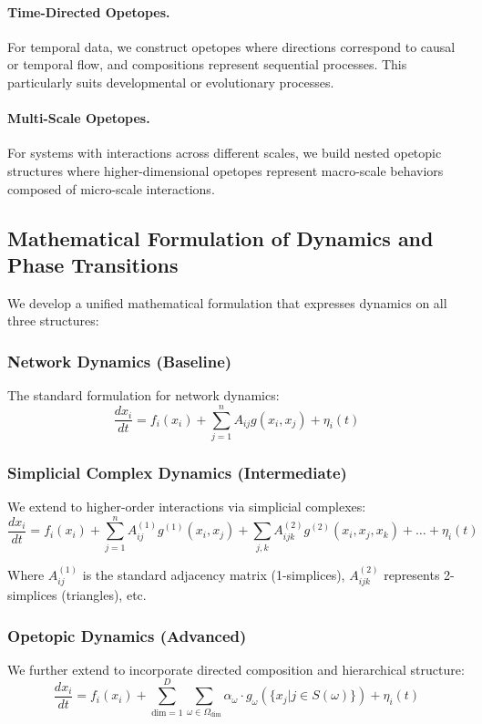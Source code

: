\paragraph{Time-Directed Opetopes.} For temporal data, we construct opetopes where directions correspond to causal or temporal flow, and compositions represent sequential processes. This particularly suits developmental or evolutionary processes.

\paragraph{Multi-Scale Opetopes.} For systems with interactions across different scales, we build nested opetopic structures where higher-dimensional opetopes represent macro-scale behaviors composed of micro-scale interactions.

\subsection{Mathematical Formulation of Dynamics and Phase Transitions}
We develop a unified mathematical formulation that expresses dynamics on all three structures:

\subsubsection{Network Dynamics (Baseline)}
The standard formulation for network dynamics:
\begin{equation}
\frac{dx_i}{dt} = f_i(x_i) + \sum_{j=1}^{n} A_{ij}g(x_i, x_j) + \eta_i(t)
\end{equation}

\subsubsection{Simplicial Complex Dynamics (Intermediate)}
We extend to higher-order interactions via simplicial complexes:
\begin{equation}
\frac{dx_i}{dt} = f_i(x_i) + \sum_{j=1}^{n} A_{ij}^{(1)}g^{(1)}(x_i, x_j) + \sum_{j,k} A_{ijk}^{(2)}g^{(2)}(x_i, x_j, x_k) + \ldots + \eta_i(t)
\end{equation}

Where $A_{ij}^{(1)}$ is the standard adjacency matrix (1-simplices), $A_{ijk}^{(2)}$ represents 2-simplices (triangles), etc.

\subsubsection{Opetopic Dynamics (Advanced)}
We further extend to incorporate directed composition and hierarchical structure:
\begin{equation}
\frac{dx_i}{dt} = f_i(x_i) + \sum_{\text{dim}=1}^{D}\sum_{\omega \in \Omega_{\text{dim}}} \alpha_\omega \cdot g_\omega(\{x_j | j \in S(\omega)\}) + \eta_i(t)
\end{equation}

